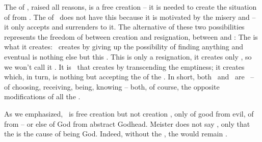 The  of \yes, raised  all 
reasons, is a free creation -- it is needed to create the situation
of  from .
The  of \No\ does not
have this  because it is motivated by the  misery and
 -- it only accepts and surrenders to it. The alternative of
these two possibilities 
represents the  freedom of  between creation and
resignation, between  and :
The  is what it creates:
\No\ creates  by giving up
the possibility of finding anything and eventual  is
nothing else but this \No. This is only a resignation, it creates only
, so we won't call it . It is  \Yes\ that
creates by transcending the emptiness; it creates  
which, in turn, is nothing but accepting the  of the .
 In short, both \Yes\ and \No\ are \nexuss\ -- of 
choosing, receiving, being, knowing -- both, of course,  the opposite
  modifications of all the . 

\label{pa:GodneedsMe}
As we emphasized, \Yes\ is free creation but not creation , only
of good from evil, of 
 from  -- or else of  God from abstract
Godhead.   Meister does 
not say , only that the  is the cause of
 being God. Indeed, without the , the
 would remain .

